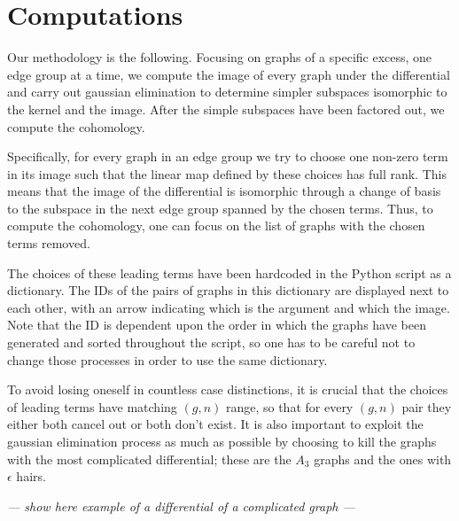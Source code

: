 \section{Computations} \label{sec:Computations}

Our methodology is the following. Focusing on graphs of a specific excess, one edge group at a time, we compute the image of every graph under the differential and carry out gaussian elimination to determine simpler subspaces isomorphic to the kernel and the image.
After the simple subspaces have been factored out, we compute the cohomology.

Specifically, for every graph in an edge group we try to choose one non-zero term in its image such that the linear map defined by these choices has full rank. This means that the image of the differential is isomorphic through a change of basis to the subspace in the next edge group spanned by the chosen terms. Thus, to compute the cohomology, one can focus on the list of graphs with the chosen terms removed.

The choices of these leading terms have been hardcoded in the Python script as a dictionary.
The IDs of the pairs of graphs in this dictionary are displayed next to each other, with an arrow indicating which is the argument and which the image. Note that the ID is dependent upon the order in which the graphs have been generated and sorted throughout the script, so one has to be careful not to change those processes in order to use the same dictionary.

To avoid losing oneself in countless case distinctions, it is crucial that the choices of leading terms have matching $(g,n)$ range, so that for every $(g,n)$ pair they either both cancel out or both don't exist. It is also important to exploit the gaussian elimination process as much as possible by choosing to kill the graphs with the most complicated differential; these are the $A_3$ graphs and the ones with $\epsilon$ hairs.

\textit{ --- show here example of a differential of a complicated graph ---}
\vspace{2cm}

